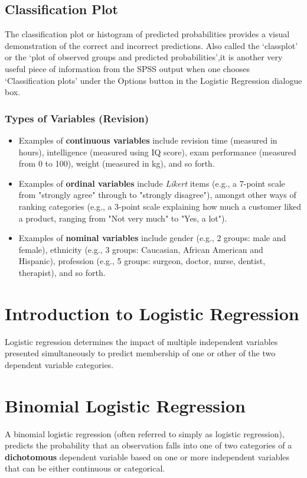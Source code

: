 \documentclass[a4paper,12pt]{article}
\begin{document}
\subsection{Classification Plot} 
The classification plot or histogram of predicted probabilities
provides a visual demonstration of the correct and incorrect predictions. Also called the ‘classplot’ or the ‘plot of observed groups and predicted probabilities’,it is another very useful piece of information from the SPSS output when one chooses
‘Classification plots’ under the Options button in the Logistic Regression dialogue box.

\newpage

\begin{framed}
	
	\subsubsection*{Types of Variables (Revision)}
	\begin{itemize}
		\item Examples of \textbf{continuous variables} include revision time (measured in hours), intelligence (measured using IQ score), exam performance (measured from 0 to 100), weight (measured in kg), and so forth. 
		
		\item Examples of \textbf{ordinal variables} include \textit{Likert} items (e.g., a 7-point scale from "strongly agree" through to "strongly disagree"), amongst other ways of ranking categories (e.g., a 3-point scale explaining how much a customer liked a product, ranging from "Not very much" to "Yes, a lot"). 
		\item Examples of \textbf{nominal variables} include gender (e.g., 2 groups: male and female), ethnicity (e.g., 3 groups: Caucasian, African American and Hispanic), profession (e.g., 5 groups: surgeon, doctor, nurse, dentist, therapist), and so forth.
	\end{itemize}
\end{framed}
\newpage
\section*{Introduction to Logistic Regression}

Logistic regression determines the impact of multiple independent variables
presented simultaneously to predict membership of one or other of the two
dependent variable categories.

\section{Binomial Logistic Regression} 
A binomial logistic regression (often referred to simply as logistic regression), predicts the probability that an observation falls into one of two categories of a \textbf{dichotomous} dependent variable based on one or more independent variables that can be either continuous or categorical.
\end{document}
